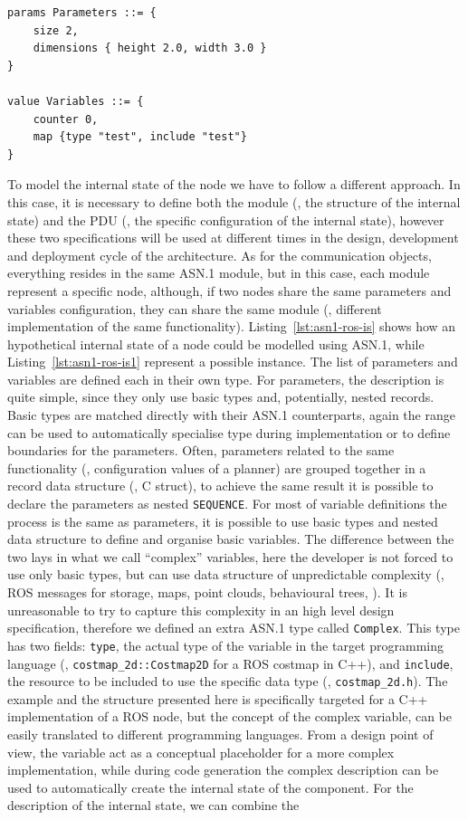 \begin{lstlisting}[float,frame=tb,caption={TODO},label=lst:asn1-ros-is1]
params Parameters ::= {
	size 2, 
	dimensions { height 2.0, width 3.0 }
}

value Variables ::= { 
	counter 0,
	map {type "test", include "test"}
}
\end{lstlisting}

To model the internal state of the node we have to follow a different approach. In this case, it is necessary to define both the module (\ie, the structure of the internal state) and the PDU (\ie, the specific configuration of the internal state), however these two specifications will be used at different times in the design, development and deployment cycle of the architecture. As for the communication objects, everything resides in the same ASN.1 module, but in this case, each module represent a specific node, although, if two nodes share the same parameters and variables configuration, they can share the same module (\eg, different implementation of the same functionality). Listing~\ref{lst:asn1-ros-is} shows how an hypothetical internal state of a node could be modelled using ASN.1, while Listing~\ref{lst:asn1-ros-is1} represent a possible instance. The list of parameters and variables are defined each in their own type. For parameters, the description is quite simple, since they only use basic types and, potentially, nested records. Basic types are matched directly with their ASN.1 counterparts, again the range can be used to automatically specialise type during implementation or to define boundaries for the parameters. Often, parameters related to the same functionality (\eg, configuration values of a planner) are grouped together in a record data structure (\eg, C struct), to achieve the same result it is possible to declare the parameters as nested \texttt{SEQUENCE}. For most of variable definitions the process is the same as parameters, it is possible to use basic types and nested data structure to define and organise basic variables. The difference between the two lays in what we call ``complex'' variables, here the developer is not forced to use only basic types, but can use data structure of unpredictable complexity (\eg, ROS messages for storage, maps, point clouds, behavioural trees, \etc). It is unreasonable to try to capture this complexity in an high level design specification, therefore we defined an extra ASN.1 type called \texttt{Complex}. This type has two fields: \texttt{type}, the actual type of the variable in the target programming language (\eg, \texttt{costmap\_2d::Costmap2D} for a ROS costmap in C++), and \texttt{include}, the resource to be included to use the specific data type (\eg, \texttt{costmap\_2d.h}). The example and the structure presented here is specifically targeted for a C++ implementation of a ROS node, but the concept of the complex variable, can be easily translated to different programming languages. From a design point of view, the variable act as a conceptual placeholder for a more complex implementation, while during code generation the complex description can be used to automatically create the internal state of the component. For the description of the internal state, we can combine the 